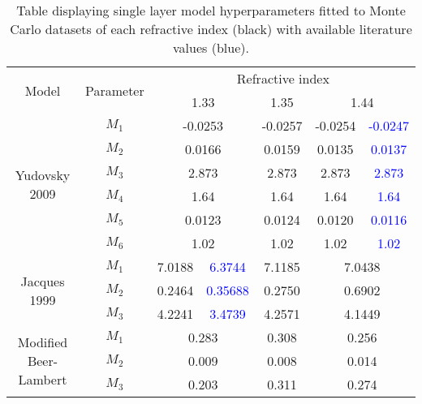 \appendix
\begin{table}[htb!]
    \centering
    \caption{Table displaying single layer model hyperparameters fitted to Monte Carlo datasets of each refractive index (black) with available literature values (blue).}
    \begin{tabular}{|cc|cc|c|cc|}
        \hline
        \multirow{2}{*}{Model} & \multirow{2}{*}{Parameter} & \multicolumn{5}{c|}{Refractive index} \\
         & & \multicolumn{2}{c|}{1.33} & 1.35 & \multicolumn{2}{c|}{1.44} \\
        \hline
        \multirow{6}{*}{Yudovsky 2009} & $M_1$ & \multicolumn{2}{c|}{-0.0253} & -0.0257 & -0.0254 & \textcolor{blue}{-0.0247} \\
        & $M_2$ & \multicolumn{2}{c|}{0.0166} & 0.0159 & 0.0135 & \textcolor{blue}{0.0137} \\
        & $M_3$ & \multicolumn{2}{c|}{2.873} & 2.873 & 2.873 & \textcolor{blue}{2.873} \\
        & $M_4$ & \multicolumn{2}{c|}{1.64} & 1.64 & 1.64 & \textcolor{blue}{1.64} \\
        & $M_5$ & \multicolumn{2}{c|}{0.0123} & 0.0124 & 0.0120 & \textcolor{blue}{0.0116} \\
        & $M_6$ & \multicolumn{2}{c|}{1.02} & 1.02 & 1.02 & \textcolor{blue}{1.02} \\
        \hline 
        \multirow{3}{*}{Jacques 1999} & $M_1$ & 7.0188 & \textcolor{blue}{6.3744} & 7.1185 & \multicolumn{2}{c|}{7.0438} \\
        & $M_2$ & 0.2464 & \textcolor{blue}{0.35688} & 0.2750 & \multicolumn{2}{c|}{0.6902} \\
        & $M_3$ & 4.2241 & \textcolor{blue}{3.4739} & 4.2571 & \multicolumn{2}{c|}{4.1449} \\
        \hline
        \multirow{3}{*}{Modified Beer-Lambert} & $M_1$ & \multicolumn{2}{c|}{0.283} & 0.308 & \multicolumn{2}{c|}{0.256} \\
        & $M_2$ & \multicolumn{2}{c|}{0.009} & 0.008 & \multicolumn{2}{c|}{0.014} \\
        & $M_3$ & \multicolumn{2}{c|}{0.203} & 0.311 & \multicolumn{2}{c|}{0.274} \\
        \hline
    \end{tabular}
    \label{tb:fittedmodelparams}
\end{table}
\FloatBarrier


